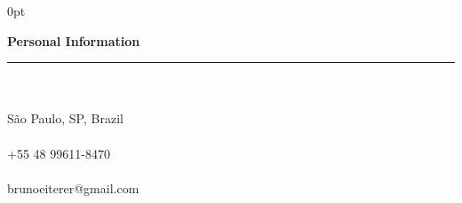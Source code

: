 \documentclass[a4paper]{article}
\begin{document}
\begin{adjustwidth}{\parindent}{0pt}
\begin{minipage}[t]{0.65\textwidth}
\end{minipage} \hspace{0.03\textwidth}
\begin{minipage}[t]{0.25\textwidth}
  \raggedright
  \Large{\textbf{Personal Information}} \normalsize \\ \rule{\textwidth}{0.5pt} \\ \hspace{0pt} \\
   \small{São Paulo, SP, Brazil} \\ \hspace{0pt} \\
   \small{+55 48 99611-8470} \\ \hspace{0pt} \\
  \small{brunoeiterer@gmail.com} \\ \hspace{0pt} \\

\end{minipage}
\end{adjustwidth}
\end{document}
